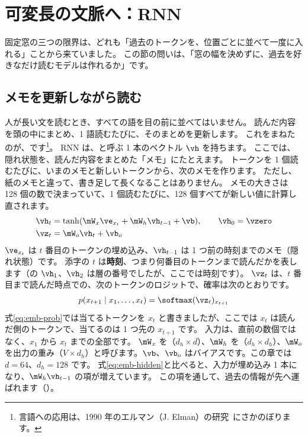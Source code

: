 \section{可変長の文脈へ：RNN}\label{sec:emb-rnn}

固定窓の三つの限界は、どれも「過去のトークンを、位置ごとに並べて一度に入れる」ことから来ていました。
この節の問いは、「窓の幅を決めずに、過去を好きなだけ読むモデルは作れるか」です。

\subsection*{メモを更新しながら読む}

人が長い文を読むとき、すべての語を目の前に並べてはいません。
読んだ内容を頭の中にまとめ、1 語読むたびに、そのまとめを更新します。
これをまねたのが、です\footnote{言語への応用は、1990 年のエルマン（J. Elman）の研究~\cite{elman1990finding}にさかのぼります。}。
RNN は、と呼ぶ 1 本のベクトル $\vh$ を持ちます。
ここでは、隠れ状態を、読んだ内容をまとめた「メモ」にたとえます。
トークンを 1 個読むたびに、いまのメモと新しいトークンから、次のメモを作ります。
ただし、紙のメモと違って、書き足して長くなることはありません。
メモの大きさは 128 個の数で決まっていて、1 個読むたびに、128 個すべてが新しい値に計算し直されます。
\begin{align}
\vh_t &= \tanh(\mW_x\ve_{x_t}+\mW_h\vh_{t-1}+\vb), \qquad \vh_0=\vzero \label{eq:emb-rnn}\\
\vz_t &= \mW_o\vh_t+\vb_o \label{eq:emb-rnn-out}
\end{align}
$\ve_{x_t}$ は $t$ 番目のトークンの埋め込み、$\vh_{t-1}$ は 1 つ前の時刻までのメモ（隠れ状態）です。
添字の $t$ は\textbf{時刻}、つまり何番目のトークンまで読んだかを表します（の $\vh_1$、$\vh_2$ は層の番号でしたが、ここでは時刻です）。
$\vz_t$ は、$t$ 番目まで読んだ時点での、次のトークンのロジットで、確率は次のとおりです。
\begin{equation}
p(x_{t+1}\mid x_1,\dots,x_t)=\softmax(\vz_t)_{x_{t+1}}
\label{eq:emb-rnn-prob}
\end{equation}
式\eqref{eq:emb-prob}では当てるトークンを $x_t$ と書きましたが、ここでは $x_t$ は読んだ側のトークンで、当てるのは 1 つ先の $x_{t+1}$ です。
入力は、直前の数個ではなく、$x_1$ から $x_t$ までの全部です。
$\mW_x$ を（$d_h\times d$）、$\mW_h$ を（$d_h\times d_h$）、$\mW_o$ を出力の重み（$V\times d_h$）と呼びます。$\vb$、$\vb_o$ はバイアスです。この章では $d=64$、$d_h=128$ です。
式\eqref{eq:emb-hidden}と比べると、入力が埋め込み 1 本になり、$\mW_h\vh_{t-1}$ の項が増えています。
この項を通して、過去の情報が先へ運ばれます（）。

